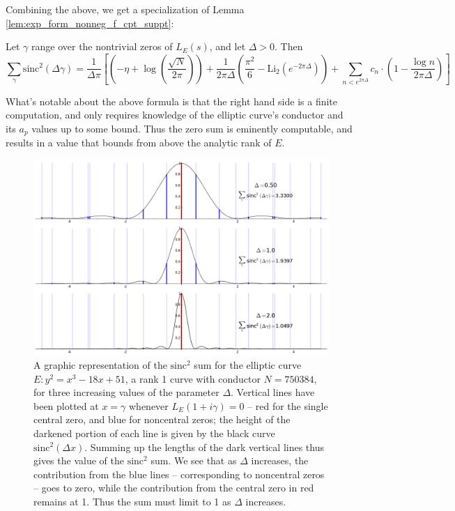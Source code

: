 \documentclass[10pt]{article}
\newcommand{\sinc}{\text{sinc}}
\newcommand{\Li}{\text{Li}}
\begin{document}
Combining the above, we get a specialization of Lemma \ref{lem:exp_form_nonneg_f_cpt_suppt}:
\begin{corollary}
Let $\gamma$ range over the nontrivial zeros of $L_E(s)$, and let $\Delta > 0$. Then
\begin{equation}\label{eqn:sincsquared_sum}
\sum_{\gamma} \sinc^2(\Delta \gamma) = \frac{1}{\Delta \pi}\left[\left(-\eta + \log\left(\frac{\sqrt{N}}{2\pi}\right)\right)+ \frac{1}{2\pi \Delta}\left(\frac{\pi^2}{6} - \Li_2\left(e^{-2\pi \Delta}\right)\right)  + \sum_{n<e^{2\pi \Delta}} c_n \cdot \left(1-\frac{\log n}{2\pi \Delta}\right)\right]
\end{equation}
\end{corollary}

What's notable about the above formula is that the right hand side is a finite computation, and only requires knowledge of the elliptic curve's conductor and its $a_p$ values up to some bound. Thus the zero sum is eminently computable, and results in a value that bounds from above the analytic rank of $E$. \\

\begin{figure}[!h]
    \centering
    \includegraphics[width=1.0\textwidth]{graphics/zero_sum_visualization.png}
    \caption{A graphic representation of the $\sinc^2$ sum for the elliptic curve $E: y^2=x^3-18x+51$, a rank 1 curve with conductor $N=750384$, for three increasing values of the parameter $\Delta$. Vertical lines have been plotted at $x=\gamma$ whenever $L_E(1+i\gamma)=0$ -- red for the single central zero, and blue for noncentral zeros; the height of the darkened portion of each line is given by the black curve $\sinc^2(\Delta x)$. Summing up the lengths of the dark vertical lines thus gives the value of the $\sinc^2$ sum. We see that as $\Delta$ increases, the contribution from the blue lines -- corresponding to noncentral zeros -- goes to zero, while the contribution from the central zero in red remains at 1. Thus the sum must limit to 1 as $\Delta$ increases.}
    \label{fig:zero_sum_visualization}
\end{figure}
\end{document}
